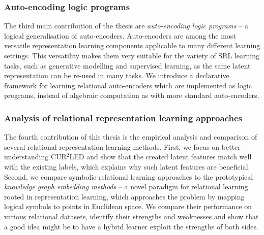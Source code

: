 \subsubsection{Auto-encoding logic programs}

The third main contribution of the thesis are \textit{auto-encoding logic programs} \cite{Dumancic2018a,AlpsSubmitted} -- a logical generalisation of auto-encoders.
Auto-encoders are among the most versatile representation learning components applicable to many different learning settings.
This versatility makes them very suitable for the variety of SRL learning tasks, such as generative modelling and supervised learning, as the same latent representation can be re-used in many tasks.
We introduce a declarative framework for learning relational auto-encoders which are implemented as logic programs, instead of algebraic computation as with more standard auto-encoders.






\subsubsection{Analysis of relational representation learning approaches}

The fourth contribution of this thesis is the empirical analysis and comparison of several relational representation learning methods.
First, we focus on better understanding CUR$^2$LED and show that the created latent features match well with the existing labels, which explains why such latent features are beneficial.
Second, we compare symbolic relational learning approaches to the prototypical \textit{knowledge graph embedding methods} -- a novel paradigm for relational learning rooted in representation learning, which approaches the problem by mapping logical symbols to points in Euclidean space.
We compare their performance on various relational datasets, identify their strengths and weaknesses and show that a good idea might be to have a hybrid learner exploit the strengths of both sides.





